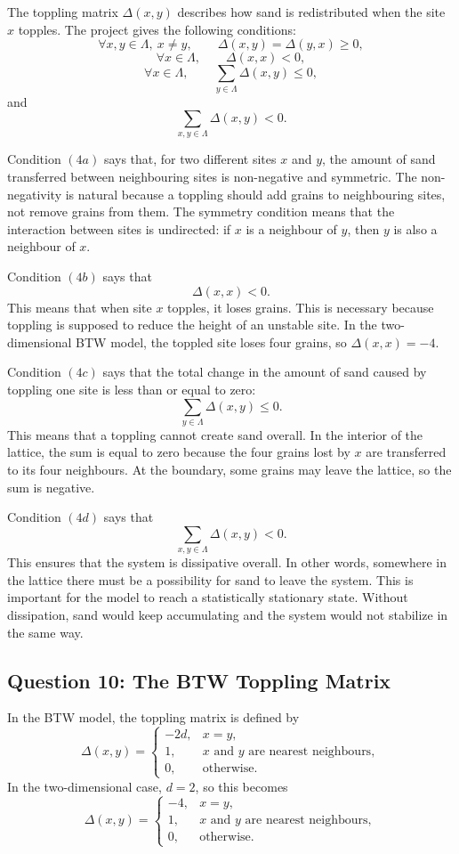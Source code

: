 The toppling matrix \(\Delta(x,y)\) describes how sand is redistributed when the site \(x\)
topples. The project gives the following conditions:
\[
\forall x,y \in \Lambda,\ x \neq y, 
\qquad
\Delta(x,y)=\Delta(y,x) \geq 0,
\tag{4a}
\]
\[
\forall x \in \Lambda,
\qquad
\Delta(x,x)<0,
\tag{4b}
\]
\[
\forall x \in \Lambda,
\qquad
\sum_{y \in \Lambda} \Delta(x,y) \leq 0,
\tag{4c}
\]
and
\[
\sum_{x,y \in \Lambda} \Delta(x,y) < 0.
\tag{4d}
\]

Condition \((4a)\) says that, for two different sites \(x\) and \(y\), the amount of sand
transferred between neighbouring sites is non-negative and symmetric. The non-negativity
is natural because a toppling should add grains to neighbouring sites, not remove grains
from them. The symmetry condition means that the interaction between sites is undirected:
if \(x\) is a neighbour of \(y\), then \(y\) is also a neighbour of \(x\).

Condition \((4b)\) says that
\[
\Delta(x,x)<0.
\]
This means that when site \(x\) topples, it loses grains. This is necessary because toppling
is supposed to reduce the height of an unstable site. In the two-dimensional BTW model,
the toppled site loses four grains, so \(\Delta(x,x)=-4\).

Condition \((4c)\) says that the total change in the amount of sand caused by toppling one
site is less than or equal to zero:
\[
\sum_{y \in \Lambda} \Delta(x,y) \leq 0.
\]
This means that a toppling cannot create sand overall. In the interior of the lattice, the sum
is equal to zero because the four grains lost by \(x\) are transferred to its four neighbours.
At the boundary, some grains may leave the lattice, so the sum is negative.

Condition \((4d)\) says that
\[
\sum_{x,y \in \Lambda} \Delta(x,y) < 0.
\]
This ensures that the system is dissipative overall. In other words, somewhere in the lattice
there must be a possibility for sand to leave the system. This is important for the model to
reach a statistically stationary state. Without dissipation, sand would keep accumulating
and the system would not stabilize in the same way.

\subsection{Question 10: The BTW Toppling Matrix}

In the BTW model, the toppling matrix is defined by
\[
\Delta(x,y)
=
\begin{cases}
-2d, & x=y, \\
1, & x \text{ and } y \text{ are nearest neighbours}, \\
0, & \text{otherwise}.
\end{cases}
\]
In the two-dimensional case, \(d=2\), so this becomes
\[
\Delta(x,y)
=
\begin{cases}
-4, & x=y, \\
1, & x \text{ and } y \text{ are nearest neighbours}, \\
0, & \text{otherwise}.
\end{cases}
\]

